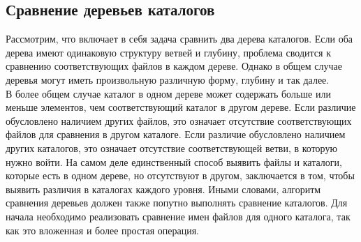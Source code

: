 \documentclass[12pt]{article}
\begin{document}
\subsection{Сравнение деревьев каталогов}
Рассмотрим, что включает в себя задача сравнить два дерева каталогов. Если оба дерева имеют одинаковую структуру ветвей и глубину, проблема сводится к сравнению соответствующих файлов в каждом дереве. Однако в общем случае деревья могут иметь произвольную различную форму, глубину и так далее. \\
В более общем случае каталог в одном дереве может содержать больше
или меньше элементов, чем соответствующий каталог в другом дереве.
Если различие обусловлено наличием других файлов, это означает отсутствие соответствующих файлов для сравнения в другом каталоге.
Если различие обусловлено наличием других каталогов, это означает
отсутствие соответствующей ветви, в которую нужно войти. На самом
деле единственный способ выявить файлы и каталоги, которые есть
в одном дереве, но отсутствуют в другом, заключается в том, чтобы выявить различия в каталогах каждого уровня.
Иными словами, алгоритм сравнения деревьев должен также попутно выполнять сравнение каталогов. Для начала необходимо реализовать сравнение имен файлов для одного каталога, так как это вложенная и более простая операция.
\end{document}
